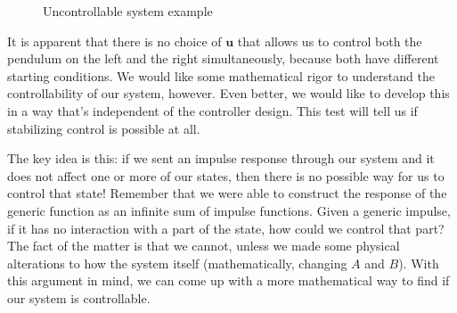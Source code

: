 \begin{figure}
    
    \caption{Uncontrollable system example}
    \label{fig:uncontrollable}
\end{figure}
It is apparent that there is no choice of $\bm{u}$ that allows us to control both the pendulum on the left and the right simultaneously, because both have different starting conditions. We would like some mathematical rigor to understand the controllability of our system, however. Even better, we would like to develop this in a way that's independent of the controller design. This test will tell us if stabilizing control is possible at all.

The key idea is this: if we sent an impulse response through our system and it does not affect one or more of our states, then there is no possible way for us to control that state! Remember that we were able to construct the response of the generic function as an infinite sum of impulse functions. Given a generic impulse, if it has no interaction with a part of the state, how could we control that part? The fact of the matter is that we cannot, unless we made some physical alterations to how the system itself (mathematically, changing $A$ and $B$). With this argument in mind, we can come up with a more mathematical way to find if our system is controllable.


